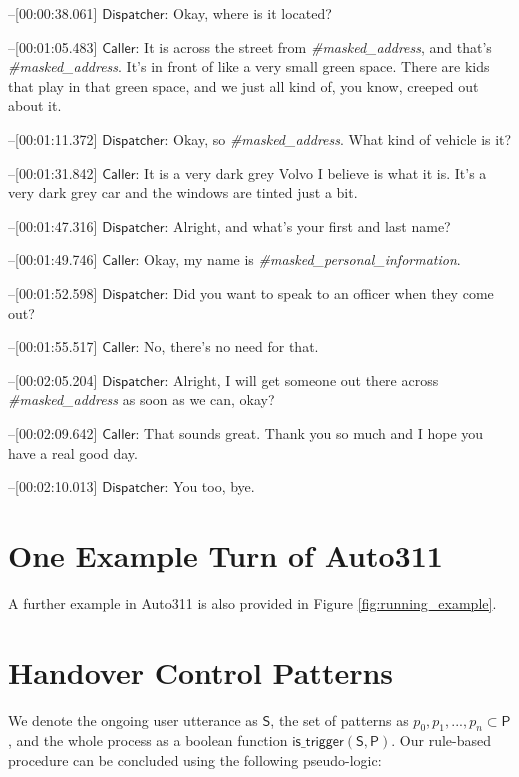 \noindent[00:00:36.863]--[00:00:38.061] $\mathsf{Dispatcher}$:  Okay, where is it located?

\noindent[00:00:39.023]--[00:01:05.483] $\mathsf{Caller}$: It is across the street from \textit{\#masked\_address}, and that's \textit{\#masked\_address}. It's in front of like a very small green space. There are kids that play in that green space, and we just all kind of, you know, creeped out about it.

\noindent[00:01:05.685]--[00:01:11.372] $\mathsf{Dispatcher}$:  Okay, so \textit{\#masked\_address}. What kind of vehicle is it?

\noindent[00:01:12.182]--[00:01:31.842] $\mathsf{Caller}$:  It is a very dark grey Volvo I believe is what it is. It's a very dark grey car and the windows are tinted just a bit.

\noindent[00:01:35.740]--[00:01:47.316] $\mathsf{Dispatcher}$: Alright, and what's your first and last name?

\noindent[00:01:48.261]--[00:01:49.746] $\mathsf{Caller}$: Okay, my name is \textit{\#masked\_personal\_information}.

\noindent[00:01:50.421]--[00:01:52.598] $\mathsf{Dispatcher}$: Did you want to speak to an officer when they come out?

\noindent[00:01:53.340]--[00:01:55.517] $\mathsf{Caller}$:  No, there's no need for that.

\noindent[00:01:55.956]--[00:02:05.204] $\mathsf{Dispatcher}$:  Alright, I will get someone out there across \textit{\#masked\_address} as soon as we can, okay?

\noindent[00:02:05.912]--[00:02:09.642] $\mathsf{Caller}$:  That sounds great. Thank you so much and I hope you have a real good day.

\noindent[00:02:09.574]--[00:02:10.013] $\mathsf{Dispatcher}$:  You too, bye.



\section{One Example Turn of Auto311}
A further example in Auto311 is also provided in Figure \ref{fig:running_example}.

\section{Handover Control Patterns}

We denote the ongoing user utterance as $\mathsf{S}$, the set of patterns as $p_0, p_1, ..., p_n \subset \mathsf{P}$, and the whole process as a boolean function $\mathsf{is\_trigger(S, {P})}$. Our rule-based procedure can be concluded using the following pseudo-logic: 

